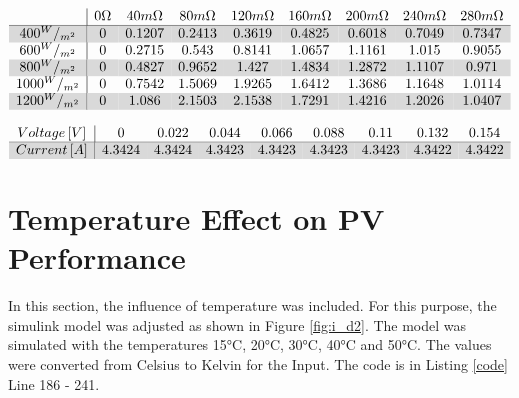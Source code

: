 	\begin{center}
	$\begin{array}{c|cccccccc}
		 & 0\Omega & 40m\Omega & 80m\Omega & 120m\Omega & 160m\Omega & 200m\Omega & 240m\Omega & 280m\Omega \\ \hline \rowcolor{lgray}
		 400^W/_{m^2} & 0 & 0.1207 & 0.2413 & 0.3619 & 0.4825 & 0.6018 & 0.7049 & 0.7347\\
		 600^W/_{m^2} & 0 & 0.2715 & 0.543 & 0.8141 & 1.0657 & 1.1161 & 1.015 & 0.9055\\ \rowcolor{lgray}
		 800^W/_{m^2} & 0 & 0.4827 & 0.9652 & 1.427 & 1.4834 & 1.2872 & 1.1107 & 0.971\\	 
		 1000^W/_{m^2} & 0 & 0.7542 & 1.5069 & 1.9265 & 1.6412 & 1.3686 & 1.1648 & 1.0114\\ \rowcolor{lgray}
		 1200^W/_{m^2} & 0 & 1.086 & 2.1503 & 2.1538 & 1.7291 & 1.4216 & 1.2026 & 1.0407 
	\end{array}$
	\label{tb:arr1}
	\end{center}

	\begin{center}
		$\begin{array}{c|cccccccc} 
			Voltage \left[ V\right] & 0 & 0.022 & 0.044 & 0.066 & 0.088 & 0.11 & 0.132 & 0.154 	\\ \hline \rowcolor{lgray}
			Current \left[ A\right] & 4.3424 & 4.3424 & 4.3423 & 4.3423 & 4.3423 & 4.3423 & 4.3422 & 4.3422		
		\end{array}$
		\label{tb:arr2}
	\end{center}




\newpage
\section{Temperature Effect on PV Performance}\label{sec:temp}
In this section, the influence of temperature was included. For this purpose, the simulink model was adjusted as shown in Figure \ref{fig:i_d2}.
The model was simulated with the temperatures 15°C, 20°C, 30°C, 40°C and 50°C. The values were converted from Celsius to Kelvin for the Input. The code is in Listing \ref{code} Line 186 - 241.


